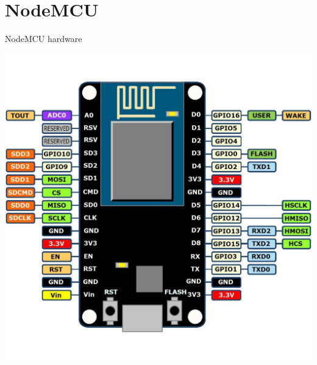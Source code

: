 \hypertarget{nodemcu}{%
\section{NodeMCU}\label{nodemcu}}

\begin{frame}{NodeMCU hardware}
\protect\hypertarget{nodemcu-hardware}{}

\includegraphics{images/NodeMCU-–-Board-de-desarrollo-con-módulo-ESP8266-WiFi-y-Lua-4.jpg}

\end{frame}

